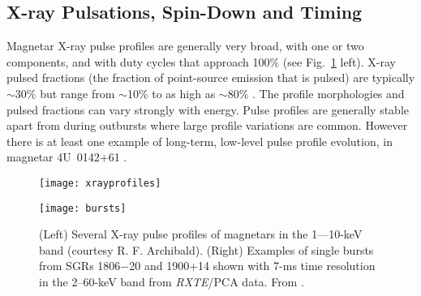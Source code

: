 

\subsection{X-ray Pulsations, Spin-Down and Timing}
\label{sec:pulsations}


Magnetar X-ray pulse profiles are generally very broad, with one or two components, and
with duty cycles that approach 100\% (see Fig.~\ref{fig:xrayprofiles} left).  X-ray 
pulsed fractions (the fraction of point-source emission that is pulsed)
are typically $\sim$30\% but range from $\sim$10\% \citep{ioa+99} to as high as $\sim$80\% \citep{kkp+12}.
The profile morphologies and pulsed fractions can vary strongly with energy.
Pulse profiles are generally stable apart from during outbursts
where large profile variations are common.
However there is at least one example of long-term, low-level pulse
profile evolution, in magnetar 4U~0142+61 \citep{gdk+10}.


\begin{figure}
\begin{minipage}{2.9in}
\hspace{-0.2in}
\texttt{[image: xrayprofiles]}
\end{minipage}
\hfill
\hspace{-0.55in}
\begin{minipage}{2.9in}
\vspace{0.4in}
\texttt{[image: bursts]}
\end{minipage}
\caption{(Left) Several X-ray pulse profiles of magnetars in the 1---10-keV band (courtesy R. F. Archibald).
(Right) Examples of single bursts from SGRs 1806$-$20 and 1900+14 shown with 7-ms time resolution in
the 2--60-keV band from {\it RXTE}/PCA data.  From \citet{gkw+01}.
}
\label{fig:xrayprofiles}
\end{figure}

